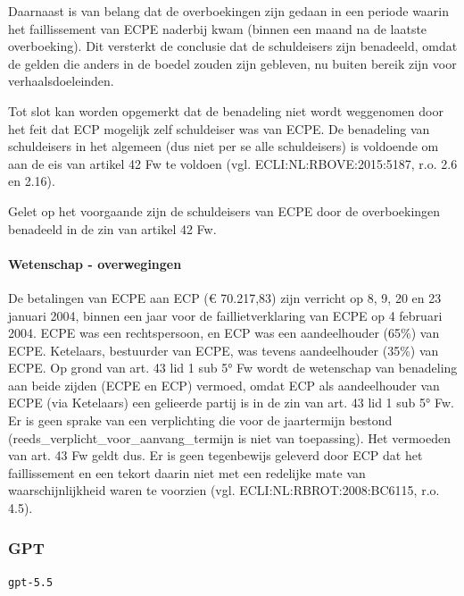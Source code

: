 \documentclass[
  dutch,
  a4paper,
]{article}
\begin{document}
Daarnaast is van belang dat de overboekingen zijn gedaan in een periode waarin het faillissement van ECPE naderbij kwam (binnen een maand na de laatste overboeking). Dit versterkt de conclusie dat de schuldeisers zijn benadeeld, omdat de gelden die anders in de boedel zouden zijn gebleven, nu buiten bereik zijn voor verhaalsdoeleinden.

Tot slot kan worden opgemerkt dat de benadeling niet wordt weggenomen door het feit dat ECP mogelijk zelf schuldeiser was van ECPE. De benadeling van schuldeisers in het algemeen (dus niet per se alle schuldeisers) is voldoende om aan de eis van artikel 42 Fw te voldoen (vgl. ECLI:NL:RBOVE:2015:5187, r.o. 2.6 en 2.16).

Gelet op het voorgaande zijn de schuldeisers van ECPE door de overboekingen benadeeld in de zin van artikel 42 Fw.

\paragraph{Wetenschap - overwegingen}\label{wetenschap---overwegingen-48}

De betalingen van ECPE aan ECP (€ 70.217,83) zijn verricht op 8, 9, 20 en 23 januari 2004, binnen een jaar voor de faillietverklaring van ECPE op 4 februari 2004. ECPE was een rechtspersoon, en ECP was een aandeelhouder (65\%) van ECPE. Ketelaars, bestuurder van ECPE, was tevens aandeelhouder (35\%) van ECPE. Op grond van art. 43 lid 1 sub 5° Fw wordt de wetenschap van benadeling aan beide zijden (ECPE en ECP) vermoed, omdat ECP als aandeelhouder van ECPE (via Ketelaars) een gelieerde partij is in de zin van art. 43 lid 1 sub 5° Fw. Er is geen sprake van een verplichting die voor de jaartermijn bestond (reeds\_verplicht\_voor\_aanvang\_termijn is niet van toepassing). Het vermoeden van art. 43 Fw geldt dus. Er is geen tegenbewijs geleverd door ECP dat het faillissement en een tekort daarin niet met een redelijke mate van waarschijnlijkheid waren te voorzien (vgl. ECLI:NL:RBROT:2008:BC6115, r.o. 4.5).

\newpage


\subsubsection{GPT}\label{gpt-16}

\texttt{gpt-5.5}
\end{document}
